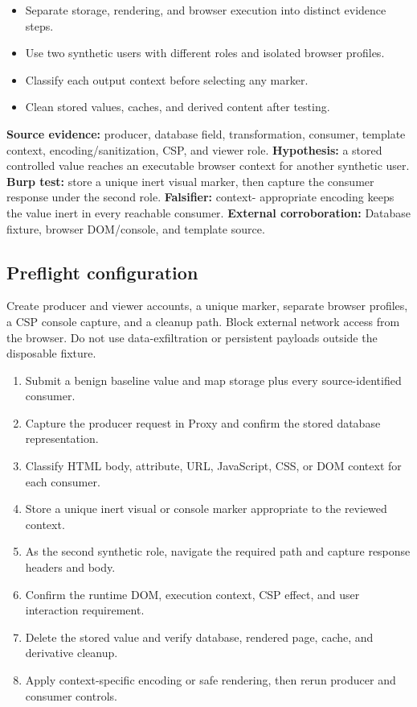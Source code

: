 \documentclass[11pt]{article}
\newcommand{\weekfield}[2]{%
  \Needspace{5\baselineskip}
  \subsection*{#1}
  #2
}
\newcommand{\externalproof}[1]{\textbf{External corroboration:} #1}
\begin{document}
\begin{objectivebox}
\begin{itemize}
  \item Separate storage, rendering, and browser execution into distinct evidence steps.
  \item Use two synthetic users with different roles and isolated browser profiles.
  \item Classify each output context before selecting any marker.
  \item Clean stored values, caches, and derived content after testing.
\end{itemize}
\end{objectivebox}

\begin{bridgebox}
\textbf{Source evidence:} producer, database field, transformation, consumer,
template context, encoding/sanitization, CSP, and viewer role. \textbf{Hypothesis:}
a stored controlled value reaches an executable browser context for another
synthetic user. \textbf{Burp test:} store a unique inert visual marker, then
capture the consumer response under the second role. \textbf{Falsifier:} context-
appropriate encoding keeps the value inert in every reachable consumer.
\externalproof{Database fixture, browser DOM/console, and template source.}
\end{bridgebox}

\weekfield{Preflight configuration}{Create producer and viewer accounts, a unique
marker, separate browser profiles, a CSP console capture, and a cleanup path.
Block external network access from the browser. Do not use data-exfiltration or
persistent payloads outside the disposable fixture.}

\begin{procedurebox}
\begin{enumerate}
  \item Submit a benign baseline value and map storage plus every source-identified consumer.
  \item Capture the producer request in Proxy and confirm the stored database representation.
  \item Classify HTML body, attribute, URL, JavaScript, CSS, or DOM context for each consumer.
  \item Store a unique inert visual or console marker appropriate to the reviewed context.
  \item As the second synthetic role, navigate the required path and capture response headers and body.
  \item Confirm the runtime DOM, execution context, CSP effect, and user interaction requirement.
  \item Delete the stored value and verify database, rendered page, cache, and derivative cleanup.
  \item Apply context-specific encoding or safe rendering, then rerun producer and consumer controls.
\end{enumerate}
\end{procedurebox}
\end{document}

